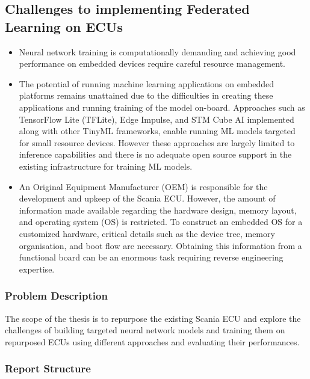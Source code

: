 \subsection*{Challenges to implementing Federated Learning on ECUs}

\begin{itemize}
	\item Neural network training is computationally demanding and achieving good performance on embedded devices require careful resource management.
	\item The potential of running machine learning applications on embedded platforms remains unattained due to the difficulties in creating these applications and running training of the model on-board. Approaches such as TensorFlow Lite (TFLite), Edge Impulse, and STM Cube AI implemented along with other TinyML frameworks, enable running ML models targeted for small resource devices. However these approaches are largely limited to inference capabilities and there is no adequate open source support in the existing infrastructure for training ML models.
	\item An Original Equipment Manufacturer (OEM) is responsible for the development and upkeep of the Scania ECU. However, the amount of information made available regarding the hardware design, memory layout, and operating system (OS) is restricted. To construct an embedded OS for a customized hardware, critical details such as the device tree, memory organisation, and boot flow are necessary. Obtaining this information from a functional board can be an enormous task requiring reverse engineering expertise.
\end{itemize}


\subsubsection{Problem Description}

The scope of the thesis is to repurpose the existing Scania ECU and explore the challenges of building targeted neural network models and training them on repurposed ECUs using different approaches and evaluating their performances.

\subsubsection{Report Structure}

